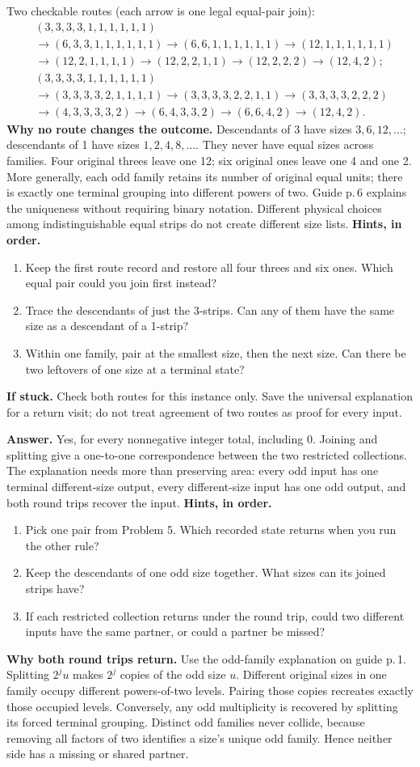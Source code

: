 \documentclass[letterpaper,11pt]{article}
\newcommand{\heading}[1]{\vspace{4pt}{\large\bfseries #1}\par}
\newcommand{\hints}[3]{\textbf{Hints, in order.}\begin{enumerate}\item #1\item #2\item #3\end{enumerate}}
\begin{document}
Two checkable routes (each arrow is one legal equal-pair join):
{\small
\begin{align*}
&(3,3,3,3,1,1,1,1,1,1)\\
&\to(6,3,3,1,1,1,1,1,1)\to(6,6,1,1,1,1,1,1)\to(12,1,1,1,1,1,1)\\
&\to(12,2,1,1,1,1)\to(12,2,2,1,1)\to(12,2,2,2)\to(12,4,2);\\[3pt]
&(3,3,3,3,1,1,1,1,1,1)\\
&\to(3,3,3,3,2,1,1,1,1)\to(3,3,3,3,2,2,1,1)\to(3,3,3,3,2,2,2)\\
&\to(4,3,3,3,3,2)\to(6,4,3,3,2)\to(6,6,4,2)\to(12,4,2).
\end{align*}}
\textbf{Why no route changes the outcome.} Descendants of 3 have sizes $3,6,12,\ldots$; descendants of 1 have sizes $1,2,4,8,\ldots$. They never have equal sizes across families. Four original threes leave one 12; six original ones leave one 4 and one 2. More generally, each odd family retains its number of original equal units; there is exactly one terminal grouping into different powers of two. Guide p.\,6 explains the uniqueness without requiring binary notation. Different physical choices among indistinguishable equal strips do not create different size lists.
\hints{Keep the first route record and restore all four threes and six ones. Which equal pair could you join first instead?}{Trace the descendants of just the 3-strips. Can any of them have the same size as a descendant of a 1-strip?}{Within one family, pair at the smallest size, then the next size. Can there be two leftovers of one size at a terminal state?}
\textbf{If stuck.} Check both routes for this instance only. Save the universal explanation for a return visit; do not treat agreement of two routes as proof for every input.

\heading{Problem 9 / student p.\,9 / general explanation, later visit}
\textbf{Answer.} Yes, for every nonnegative integer total, including 0. Joining and splitting give a one-to-one correspondence between the two restricted collections. The explanation needs more than preserving area: every odd input has one terminal different-size output, every different-size input has one odd output, and both round trips recover the input.
\hints{Pick one pair from Problem 5. Which recorded state returns when you run the other rule?}{Keep the descendants of one odd size together. What sizes can its joined strips have?}{If each restricted collection returns under the round trip, could two different inputs have the same partner, or could a partner be missed?}
\textbf{Why both round trips return.} Use the odd-family explanation on guide p.\,1. Splitting $2^ju$ makes $2^j$ copies of the odd size $u$. Different original sizes in one family occupy different powers-of-two levels. Pairing those copies recreates exactly those occupied levels. Conversely, any odd multiplicity is recovered by splitting its forced terminal grouping. Distinct odd families never collide, because removing all factors of two identifies a size's unique odd family. Hence neither side has a missing or shared partner.
\end{document}
